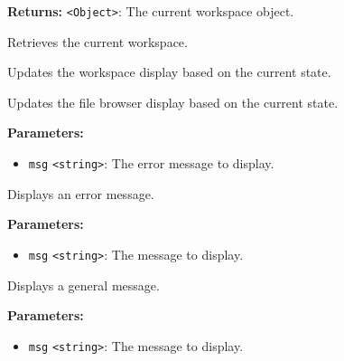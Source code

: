 \documentclass[12pt,a4paper]{article}
\begin{document}
\noindent \textbf{Returns:} \texttt{<Object>}: The current workspace object.

\noindent Retrieves the current workspace.

\vspace{5mm}
\noindent {}


\noindent Updates the workspace display based on the current state.

\vspace{5mm}
\noindent {}


\noindent Updates the file browser display based on the current state.

\vspace{5mm}
\noindent {}


\noindent \textbf{Parameters:}
\begin{itemize}
  \item \texttt{msg} \texttt{<string>}: The error message to display.
\end{itemize}

\noindent Displays an error message.

\vspace{5mm}
\noindent {}


\noindent \textbf{Parameters:}
\begin{itemize}
  \item \texttt{msg} \texttt{<string>}: The message to display.
\end{itemize}

\noindent Displays a general message.

\vspace{5mm}
\noindent {}


\noindent \textbf{Parameters:}
\begin{itemize}
  \item \texttt{msg} \texttt{<string>}: The message to display.
\end{itemize}
\end{document}
